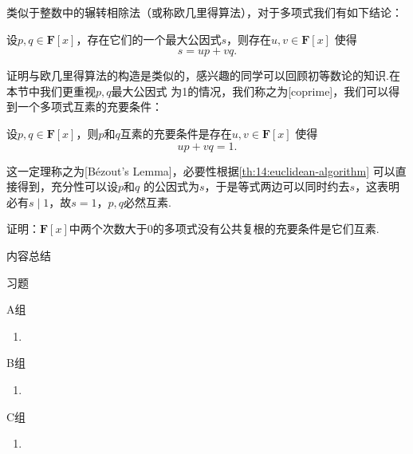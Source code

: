 类似于整数中的辗转相除法（或称欧几里得算法），对于多项式我们有如下结论：
\begin{theorem}\label{th:14:euclidean-algorithm}
    设$p,q\in\mathbf{F}[x]$，存在它们的一个最大公因式$s$，则存在$u,v\in\mathbf{F}[x]$
    使得\[s=up+vq.\]
\end{theorem}
证明与欧几里得算法的构造是类似的，感兴趣的同学可以回顾初等数论的知识.在本节中我们更重视$p,q$最大公因式
为1的情况，我们称之为[coprime]，我们可以得到一个多项式互素的充要条件：
\begin{theorem}\label{th:14:bezout-lemma}
    设$p,q\in\mathbf{F}[x]$，则$p$和$q$互素的充要条件是存在$u,v\in\mathbf{F}[x]$
    使得\[up+vq=1.\]
\end{theorem}
这一定理称之为[B\'ezout's Lemma]，必要性根据\autoref{th:14:euclidean-algorithm} 可以直接得到，充分性可以设$p$和$q$
的公因式为$s$，于是等式两边可以同时约去$s$，这表明必有$s \mid 1$，故$s=1$，$p,q$必然互素.
\begin{example}
    证明：$\mathbf{F}[x]$中两个次数大于0的多项式没有公共复根的充要条件是它们互素.
\end{example}

\vspace{2ex}
\centerline{\heiti \Large 内容总结}

\vspace{2ex}

\centerline{\heiti \Large 习题}
\vspace{2ex}
{\kaishu }
\begin{flushright}
    \kaishu

\end{flushright}
\centerline{\heiti A组}
\begin{enumerate}
    \item
\end{enumerate}
\centerline{\heiti B组}
\begin{enumerate}
    \item
\end{enumerate}
\centerline{\heiti C组}
\begin{enumerate}
    \item
\end{enumerate}
